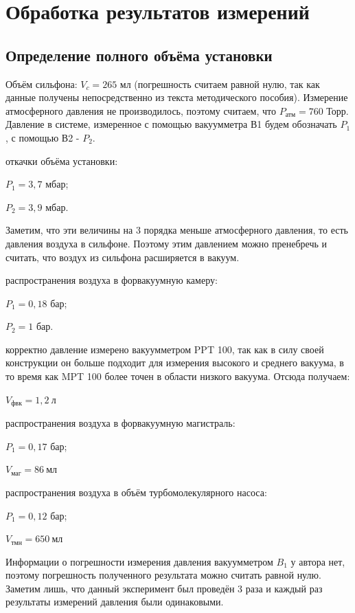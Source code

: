 \documentclass[15pt,a5paper,reqno]{article}
\begin{document}
\section{Обработка результатов измерений}

    \subsection{Определение полного объёма установки}
    
    Объём сильфона: $V_{c} = 265\text{ мл}$ (погрешность считаем равной нулю, так как данные получены непосредственно из текста методического пособия).
    Измерение атмосферного давления не производилось, поэтому считаем, что $P_{\text{атм}} = 760\text{ Торр}$.
    Давление в системе, измеренное с помощью вакуумметра В1 будем обозначать $P_1$, с помощью В2 - $P_2$.
    
     откачки объёма установки:
    
    $P_1 = 3,7\text{ мбар}$;
    
    $P_2 = 3,9\text{ мбар}$.
    
    Заметим, что эти величины на 3 порядка меньше атмосферного давления, то есть давления воздуха в сильфоне. Поэтому этим давлением можно пренебречь и считать, что воздух из сильфона расширяется в вакуум.
    
     распространения воздуха в форвакуумную камеру:
    
    $P_1 = 0,18\text{ бар}$;
    
    $P_2 = 1\text{ бар}$.
    
     корректно давление измерено вакуумметром PPT 100, так как в силу своей конструкции он больше подходит для измерения высокого и среднего вакуума, в то время как MPT 100 более точен в области низкого вакуума. Отсюда получаем:
    
    $V_{\text{фвк}} = 1,2\>л$
    
     распространения воздуха в форвакуумную магистраль:
    
    $P_1 = 0,17\text{ бар}$;
    
    $V_{\text{маг}} = 86\>мл$
    
     распространения воздуха в объём турбомолекулярного насоса:
    
    $P_1 = 0,12\text{ бар}$;
    
    $V_{\text{тмн}} = 650\>мл$
    
    Информации о погрешности измерения давления вакуумметром $B_1$ у автора нет, поэтому погрешность полученного результата можно считать равной нулю. Заметим лишь, что данный эксперимент был проведён 3 раза и каждый раз результаты измерений давления были одинаковыми.
    
\end{document}
